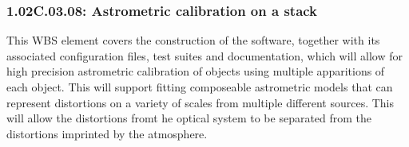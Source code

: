 \subsubsection{1.02C.03.08: Astrometric calibration on a stack}

This WBS element covers the construction of the software, together with
its associated configuration files, test suites and documentation, which
will allow for high precision astrometric calibration of objects using
multiple apparitions of each object.  This will support fitting composeable
astrometric models that can represent distortions on a variety of scales
from multiple different sources.  This will allow the distortions fromt he
optical system to be separated from the distortions imprinted by the atmosphere.
